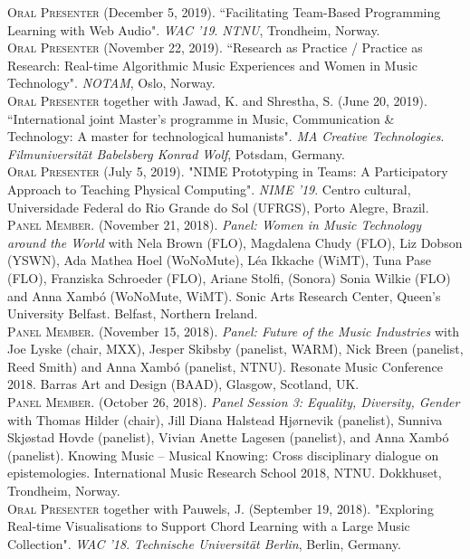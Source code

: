 \documentclass[10pt, a4paper]{article}
\newcommand{\years}[1]{\marginnote{\scriptsize #1}}
\begin{document}
{\years{2019d} \textsc{Oral Presenter} (December 5, 2019). “Facilitating Team-Based Programming Learning with Web Audio". \emph{WAC '19}. 
\emph{NTNU}, Trondheim, Norway.\\
\years{2019c} \textsc{Oral Presenter} (November 22, 2019). “Research as Practice / Practice as Research: Real-time Algorithmic Music Experiences and Women in Music Technology". \emph{NOTAM}, Oslo, Norway.\\
\years{2019b} \textsc{Oral Presenter} together with Jawad, K. and Shrestha, S. (June 20, 2019). “International joint Master's programme in Music, Communication \& Technology: A master for technological humanists". \emph{MA Creative Technologies}. \emph{Filmuniversität  Babelsberg Konrad Wolf}, Potsdam, Germany.\\
\years{2019a} \textsc{Oral Presenter} (July 5, 2019). "NIME Prototyping in Teams: A Participatory Approach to Teaching Physical Computing". \emph{NIME '19}. Centro cultural, Universidade Federal do Rio Grande do Sol (UFRGS), Porto Alegre, Brazil.\\
\years{2018j}\textsc{Panel Member}. (November 21, 2018). \emph{Panel: Women in Music Technology around the World} with Nela Brown (FLO), Magdalena Chudy (FLO), Liz Dobson (YSWN), Ada Mathea Hoel (WoNoMute), Léa Ikkache (WiMT), Tuna Pase (FLO), Franziska Schroeder (FLO), Ariane Stolfi, (Sonora) Sonia Wilkie (FLO) and Anna Xambó (WoNoMute, WiMT). Sonic Arts Research Center, Queen's University Belfast. Belfast, Northern Ireland.\\
\years{2018i}\textsc{Panel Member}. (November 15, 2018). \emph{Panel: Future of the Music Industries} with Joe Lyske (chair, MXX), Jesper Skibsby (panelist, WARM), Nick Breen (panelist, Reed Smith) and Anna Xambó (panelist, NTNU). Resonate Music Conference 2018. Barras Art and Design (BAAD), Glasgow, Scotland, UK.\\
\years{2018h}\textsc{Panel Member}. (October 26, 2018). \emph{Panel Session 3: Equality, Diversity, Gender} with Thomas Hilder (chair), Jill Diana Halstead Hjørnevik (panelist), Sunniva Skjøstad Hovde (panelist), Vivian Anette Lagesen (panelist), and Anna Xambó (panelist). Knowing Music -- Musical Knowing: Cross disciplinary dialogue on epistemologies. International Music Research School 2018, NTNU. Dokkhuset, Trondheim, Norway.\\
\years{2018g} \textsc{Oral Presenter} together with Pauwels, J.  (September 19, 2018). "Exploring Real-time Visualisations to Support Chord Learning with a Large Music Collection". \emph{WAC '18}. \emph{Technische Universität Berlin}, Berlin, Germany.\\
}
\end{document}

